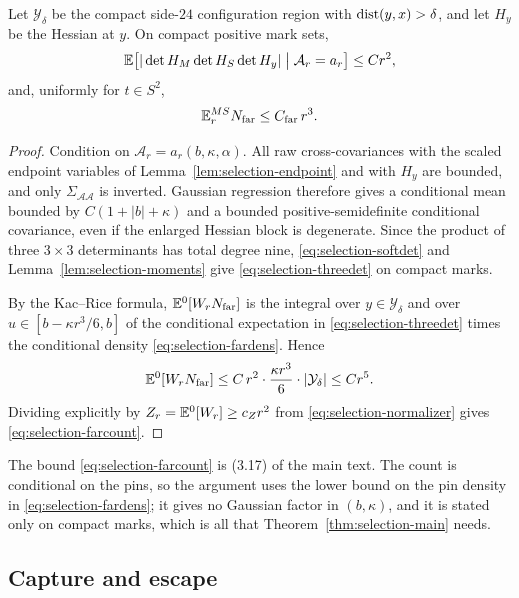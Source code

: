 \begin{lemma}\label{lem:selection-far}
Let $\mathcal Y_\delta$ be the compact side-$24$ configuration region with $\operatorname{dist}(y,x)>\delta$, and let $H_y$ be the Hessian at $y$. On compact positive mark sets,
\begin{equation}\label{eq:selection-threedet}
\mathbb E\bigl[|\det H_M\det H_S\det H_y|\bigm|\mathcal A_r=a_r\bigr]\le Cr^2,
\end{equation}
and, uniformly for $t\in S^2$,
\begin{equation}\label{eq:selection-farcount}
\mathbb E^{MS}_rN_{\rm far}\le C_{\rm far}\,r^3 .
\end{equation}
\end{lemma}

\begin{proof}
Condition on $\mathcal A_r=a_r(b,\kappa,\alpha)$. All raw cross-covariances with the scaled endpoint variables of Lemma~\ref{lem:selection-endpoint} and with $H_y$ are bounded, and only $\Sigma_{\mathcal A\mathcal A}$ is inverted. Gaussian regression therefore gives a conditional mean bounded by $C(1+|b|+\kappa)$ and a bounded positive-semidefinite conditional covariance, even if the enlarged Hessian block is degenerate. Since the product of three $3\times3$ determinants has total degree nine, \eqref{eq:selection-softdet} and Lemma~\ref{lem:selection-moments} give \eqref{eq:selection-threedet} on compact marks.

By the Kac--Rice formula, $\mathbb E^0[W_rN_{\rm far}]$ is the integral over $y\in\mathcal Y_\delta$ and over $u\in[b-\kappa r^3/6,b]$ of the conditional expectation in \eqref{eq:selection-threedet} times the conditional density \eqref{eq:selection-fardens}. Hence
\begin{equation}\label{eq:selection-farnum}
\mathbb E^0[W_rN_{\rm far}]\le C\,r^2\cdot\frac{\kappa r^3}6\cdot|\mathcal Y_\delta|\le Cr^5 .
\end{equation}
Dividing explicitly by $Z_r=\mathbb E^0[W_r]\ge c_Zr^2$ from \eqref{eq:selection-normalizer} gives \eqref{eq:selection-farcount}.
\end{proof}

The bound \eqref{eq:selection-farcount} is (3.17) of the main text. The count is conditional on the pins, so the argument uses the lower bound on the pin density in \eqref{eq:selection-fardens}; it gives no Gaussian factor in $(b,\kappa)$, and it is stated only on compact marks, which is all that Theorem~\ref{thm:selection-main} needs.

\subsection{Capture and escape}\label{ssec:selection-escape}

